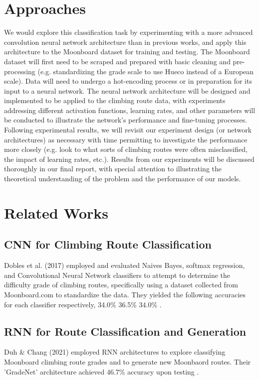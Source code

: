 \documentclass[10pt]{article}
\begin{document}
\section{Approaches}
We would explore this classification task by experimenting with a more advanced
convolution neural network architecture than in previous works,
and apply this architecture to the Moonboard dataset for training and
testing. The Moonboard dataset will first need to be scraped and prepared with
basic cleaning and pre-processing (e.g. standardizing the grade scale to use
Hueco instead of a European scale). Data will need to undergo a
hot-encoding process or in preparation for its input to a neural
network. The neural network architecture will be designed and implemented to be
applied to the climbing route data, with experiments addressing different
activation functions, learning rates, and other parameters 
will be conducted to illustrate the network's performance and fine-tuning
processes. Following experimental results, we will revisit our experiment
design (or network architectures) as necessary with time permitting to
investigate the performance more closely (e.g. look to what sorts of climbing
routes were often misclassified, the impact of learning rates, etc.). Results from
our experiments will be discussed thoroughly in our final report, with special
attention to illustrating the theoretical understanding of the problem and the
performance of our models.

\section{Related Works}
\subsection{CNN for Climbing Route Classification}
Dobles et al. (2017) employed and evaluated Naives Bayes, softmax regression,
and Convolutional Neural Network classifiers to attempt to determine the
difficulty grade of climbing routes, specifically using a dataset collected
from Moonboard.com to standardize the data. They yielded the following
accuracies for each classifier respectively, 34.0\% 36.5\% 34.0\% \cite{dobles_sarmiento_satterthwaite_2017}.

\subsection{RNN for Route Classification and Generation}
Duh \& Chang (2021) employed RNN architectures to explore classifying
Moonboard climbing route grades and to generate new Moonbaord routes. Their
'GradeNet' architecture achieved 46.7\% accuracy upon testing \cite{DBLP:journals/corr/abs-2102-01788}.
\end{document}
